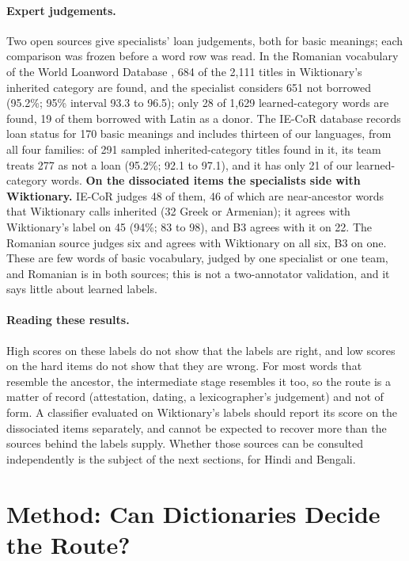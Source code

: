 \documentclass[11pt]{article}
\begin{document}
\paragraph{Expert judgements.} Two open sources give specialists' loan judgements, both for basic meanings; each comparison was frozen before a word row was read. In the Romanian vocabulary of the World Loanword Database \citep{schulte2009romanian}, 684 of the 2,111 titles in Wiktionary's inherited category are found, and the specialist considers 651 not borrowed (95.2\%; 95\% interval 93.3 to 96.5); only 28 of 1,629 learned-category words are found, 19 of them borrowed with Latin as a donor. The IE-CoR database \citep{heggarty2024iecor} records loan status for 170 basic meanings and includes thirteen of our languages, from all four families: of 291 sampled inherited-category titles found in it, its team treats 277 as not a loan (95.2\%; 92.1 to 97.1), and it has only 21 of our learned-category words. \textbf{On the dissociated items the specialists side with Wiktionary.} IE-CoR judges 48 of them, 46 of which are near-ancestor words that Wiktionary calls inherited (32 Greek or Armenian); it agrees with Wiktionary's label on 45 (94\%; 83 to 98), and B3 agrees with it on 22. The Romanian source judges six and agrees with Wiktionary on all six, B3 on one. These are few words of basic vocabulary, judged by one specialist or one team, and Romanian is in both sources; this is not a two-annotator validation, and it says little about learned labels.

\paragraph{Reading these results.} High scores on these labels do not show that the labels are right, and low scores on the hard items do not show that they are wrong. For most words that resemble the ancestor, the intermediate stage resembles it too, so the route is a matter of record (attestation, dating, a lexicographer's judgement) and not of form. A classifier evaluated on Wiktionary's labels should report its score on the dissociated items separately, and cannot be expected to recover more than the sources behind the labels supply. Whether those sources can be consulted independently is the subject of the next sections, for Hindi and Bengali.

\section{Method: Can Dictionaries Decide the Route?}
\label{sec:method}
\end{document}
